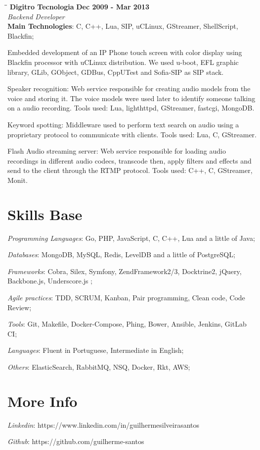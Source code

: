 \documentclass[margin]{res}
\begin{document}
\begin{resume}
\vspace{-0.1in}
    \begin{tabbing}
    \hspace{2.3in}\= \hspace{1.7in}\= \kill
    \textbf{Digitro Tecnologia}    \>\>\textbf{Dec 2009 - Mar 2013}\\
    \textit{Backend Developer}\\
    \textbf{Main Technologies}: C, C++, Lua, SIP, uCLinux, GStreamer, ShellScript, Blackfin;
    \end{tabbing}\vspace{-20pt}
    \vspace{2mm}
Embedded development of an IP Phone touch screen with color display using Blackfin processor with uCLinux distribution. We used u-boot, EFL graphic library, GLib, GObject, GDBus, CppUTest and Sofia-SIP as SIP stack.

Speaker recognition: Web service responsible for creating audio models from the voice and storing it. The voice models were used later to identify someone talking on a audio recording. Tools used: Lua, lighthttpd, GStreamer, fastcgi, MongoDB.

Keyword spotting: Middleware used to perform text search on audio using a proprietary protocol to communicate with clients. Tools used: Lua, C, GStreamer.

Flash Audio streaming server: Web service responsible for loading audio recordings in different audio codecs, transcode then, apply filters and effects and send to the client through the RTMP protocol. Tools used: C++, C, GStreamer, Monit.

\section{Skills Base} \textit{Programming Languages}: Go, PHP, JavaScript, C, C++, Lua and a little of Java;

	\textit{Databases}: MongoDB, MySQL, Redis, LevelDB and a little of PostgreSQL;

	\textit{Frameworks}: Cobra, Silex, Symfony, ZendFramework2/3, Docktrine2, jQuery, Backbone.js, Underscore.js ;

	\textit{Agile practices}: TDD, SCRUM, Kanban, Pair programming, Clean code, Code Review;

	\textit{Tools}: Git, Makefile, Docker-Compose, Phing, Bower, Ansible, Jenkins, GitLab CI;

	\textit{Languages}: Fluent in Portuguese, Intermediate in English;

	\textit{Others}: ElasticSearch, RabbitMQ, NSQ, Docker, Rkt, AWS;

\section{More Info} \textit{Linkedin}: https://www.linkedin.com/in/guilhermesilveirasantos

    \textit{Github}: https://github.com/guilherme-santos

\end{resume}
\end{document}
